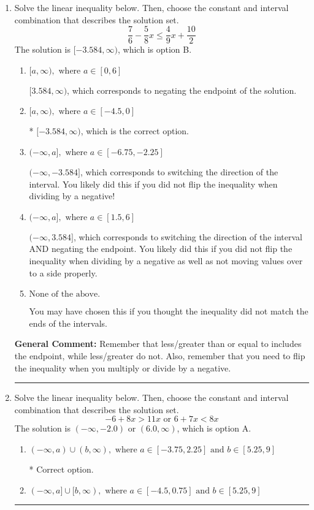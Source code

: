 \documentclass{extbook}[14pt]
\newcommand{\litem}[1]{\item #1

\rule{\textwidth}{0.4pt}}
\begin{document}
\begin{enumerate}\litem{
Solve the linear inequality below. Then, choose the constant and interval combination that describes the solution set.
\[ \frac{7}{6} - \frac{5}{8} x \leq \frac{4}{9} x + \frac{10}{2} \]The solution is \( [-3.584, \infty) \), which is option B.\begin{enumerate}[label=\Alph*.]
\item \( [a, \infty), \text{ where } a \in [0, 6] \)

 $[3.584, \infty)$, which corresponds to negating the endpoint of the solution.
\item \( [a, \infty), \text{ where } a \in [-4.5, 0] \)

* $[-3.584, \infty)$, which is the correct option.
\item \( (-\infty, a], \text{ where } a \in [-6.75, -2.25] \)

 $(-\infty, -3.584]$, which corresponds to switching the direction of the interval. You likely did this if you did not flip the inequality when dividing by a negative!
\item \( (-\infty, a], \text{ where } a \in [1.5, 6] \)

 $(-\infty, 3.584]$, which corresponds to switching the direction of the interval AND negating the endpoint. You likely did this if you did not flip the inequality when dividing by a negative as well as not moving values over to a side properly.
\item \( \text{None of the above}. \)

You may have chosen this if you thought the inequality did not match the ends of the intervals.
\end{enumerate}

\textbf{General Comment:} Remember that less/greater than or equal to includes the endpoint, while less/greater do not. Also, remember that you need to flip the inequality when you multiply or divide by a negative.
}
\litem{
Solve the linear inequality below. Then, choose the constant and interval combination that describes the solution set.
\[ -6 + 8 x > 11 x \text{ or } 6 + 7 x < 8 x \]The solution is \( (-\infty, -2.0) \text{ or } (6.0, \infty) \), which is option A.\begin{enumerate}[label=\Alph*.]
\item \( (-\infty, a) \cup (b, \infty), \text{ where } a \in [-3.75, 2.25] \text{ and } b \in [5.25, 9] \)

 * Correct option.
\item \( (-\infty, a] \cup [b, \infty), \text{ where } a \in [-4.5, 0.75] \text{ and } b \in [5.25, 9] \)


\end{enumerate}}
\end{enumerate}
\end{document}
